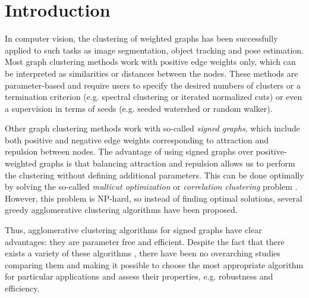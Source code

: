 
\section{Introduction}
In computer vision, the clustering of weighted graphs has been successfully applied to such tasks as image segmentation, object tracking and pose estimation. %
Most graph clustering methods work with positive edge weights only, which can be interpreted as similarities or distances between the nodes. These methods are parameter-based and require users to specify the desired numbers of clusters or a termination criterion (e.g. spectral clustering or iterated normalized cuts) or even a supervision in terms of seeds (e.g. seeded watershed or random walker).  

Other graph clustering methods work with so-called \emph{signed graphs}, which include both positive and negative edge weights corresponding to attraction and repulsion between nodes. The advantage of using signed graphs over positive-weighted graphs is that balancing attraction and repulsion allows us to perform the clustering without defining additional parameters. This can be done optimally by solving the so-called \emph{multicut optimization} or \emph{correlation clustering} problem \cite{kappes2011globally,chopra1991multiway}. However, this problem is NP-hard, so instead of finding optimal solutions, several greedy agglomerative clustering algorithms have been proposed. 

Thus, agglomerative clustering algorithms for signed graphs have clear advantages: they are parameter free and efficient. Despite the fact that there exists a variety of these algorithms \cite{keuper2015efficient,levinkov2017comparative,wolf2018mutex,kardoostsolving}, there have been no overarching studies comparing them and making it possible to choose the most appropriate algorithm for particular applications and assess their properties, e.g. robustness and efficiency.


